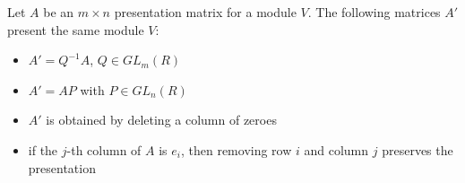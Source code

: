 \documentclass{memoir}
\begin{document}
\begin{prop}
	Let \(A\) be an \(m \times n\) presentation matrix for a module \(V\). The following matrices \(A' \) present the same module \(V\):
	\begin{itemize}
		\item \(A' = Q^{-1}A\), \(Q \in GL_m(R)\)
		\item \(A' = AP\) with \(P \in GL_n(R)\)
		\item \(A'\) is obtained by deleting a column of zeroes
		\item if the \(j\)-th column of \(A\) is \(e_i\), then removing row \(i\) and column \(j\) preserves the presentation
	\end{itemize}
\end{prop}

\end{document}
